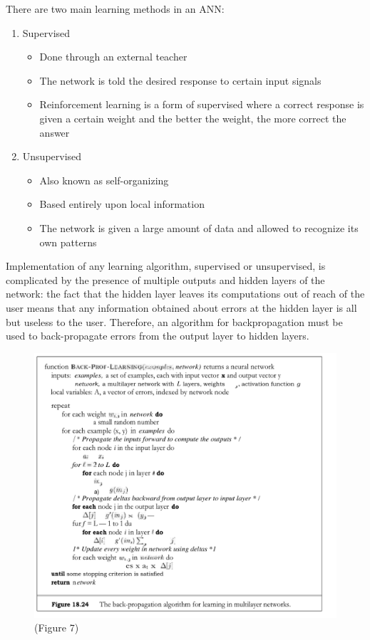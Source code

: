 \documentclass[8pt]{beamer}
\begin{document}
\begin{frame}
There are two main learning methods in an ANN:
\begin{enumerate}
\item Supervised
\begin{itemize}
\item Done through an external teacher
\item The network is told the desired response to certain input signals
\item Reinforcement learning is a form of supervised where a correct response is given a certain weight and the better the weight, the more correct the answer
\end{itemize}

\item Unsupervised
\begin{itemize}
\item Also known as self-organizing
\item Based entirely upon local information
\item The network is given a large amount of data and allowed to recognize its own patterns
\end{itemize}
\end{enumerate}
\end{frame}

\begin{frame}
Implementation of any learning algorithm, supervised or unsupervised, is complicated by the presence of multiple outputs and hidden layers of the network: the fact that the hidden layer leaves its computations out of reach of the user means that any information obtained about errors at the hidden layer is all but useless to the user. Therefore, an algorithm for backpropagation must be used to back-propagate errors from the output layer to hidden layers.
\end{frame}

\begin{frame}
\begin{figure}
	\center \includegraphics[scale=.195]{backprop.png}
	\center \tiny(Figure 7)
\end{figure}
\end{frame}
\end{document}
